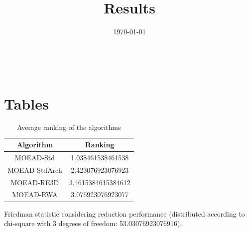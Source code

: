 \documentclass{article}
\title{Results}
\author{}
\date{\today}
\begin{document}
\oddsidemargin 0in \topmargin 0in\maketitle
\
\section{Tables}
\begin{table}[!htp]
\centering
\caption{Average ranking of the algorithms}
\begin{tabular}{c|c}
Algorithm&Ranking\\
\hline
MOEAD-Std&1.038461538461538\\
MOEAD-StdArch&2.423076923076923\\
MOEAD-RE3D&3.4615384615384612\\
MOEAD-RWA&3.076923076923077\\
\end{tabular}
\end{table}


Friedman statistic considering reduction performance (distributed according to chi-square with 3 degrees of freedom: 53.03076923076916).
\end{document}
